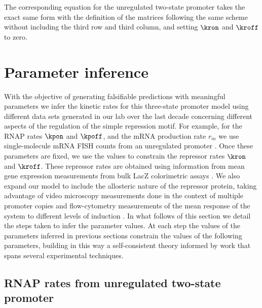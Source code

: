 The corresponding equation for the unregulated two-state promoter takes the
exact same form with the definition of the matrices following the same scheme
without including the third row and third column, and setting $\kron$ and
$\kroff$ to zero.

\section{Parameter inference}\label{supp_param_inference}

With the objective of generating falsifiable predictions with meaningful
parameters we infer the kinetic rates for this three-state promoter model using
different data sets generated in our lab over the last decade concerning
different aspects of the regulation of the simple repression motif. For example,
for the RNAP rates $\kpon$ and $\kpoff$, and the mRNA production rate $r_m$ we
use single-molecule mRNA FISH counts from an unregulated promoter
\cite{Jones2014a}. Once these parameters are fixed, we use the values to
constrain the repressor rates $\kron$ and $\kroff$. These repressor rates are
obtained using information from mean gene expression measurements from bulk LacZ
colorimetric assays \cite{Garcia2011c}. We also expand our model to include the
allosteric nature of the repressor protein, taking advantage of video microscopy
measurements done in the context of multiple promoter copies \cite{Brewster2014}
and flow-cytometry measurements of the mean response of the system to different
levels of induction \cite{Razo-Mejia2018}. In what follows of this section we
detail the steps taken to infer the parameter values. At each step the values of
the parameters inferred in previous sections constrain the values of the
following parameters, building in this way a self-consistent theory informed by
work that spans several experimental techniques.

\subsection{RNAP rates from unregulated two-state promoter}

